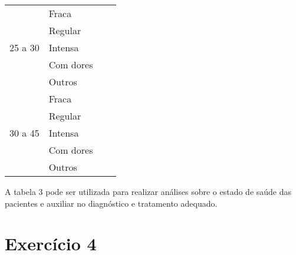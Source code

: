 \documentclass{article}
\begin{document}
\begin{table}[h!]
\begin{tabular}{|clll|}
\multicolumn{1}{|c|}{\multirow{5}{*}{25 a 30}} & \multicolumn{1}{l|}{Fraca}           & \multicolumn{1}{l|}{}            &       \\ \cline{2-4} 
\multicolumn{1}{|c|}{}                         & \multicolumn{1}{l|}{Regular}         & \multicolumn{1}{l|}{}            &       \\ \cline{2-4} 
\multicolumn{1}{|c|}{}                         & \multicolumn{1}{l|}{Intensa}         & \multicolumn{1}{l|}{}            &       \\ \cline{2-4} 
\multicolumn{1}{|c|}{}                         & \multicolumn{1}{l|}{Com dores}       & \multicolumn{1}{l|}{}            &       \\ \cline{2-4} 
\multicolumn{1}{|c|}{}                         & \multicolumn{1}{l|}{Outros}          & \multicolumn{1}{l|}{}            &       \\ \hline
\multicolumn{1}{|c|}{\multirow{5}{*}{30 a 45}} & \multicolumn{1}{l|}{Fraca}           & \multicolumn{1}{l|}{}            &       \\ \cline{2-4} 
\multicolumn{1}{|c|}{}                         & \multicolumn{1}{l|}{Regular}         & \multicolumn{1}{l|}{}            &       \\ \cline{2-4} 
\multicolumn{1}{|c|}{}                         & \multicolumn{1}{l|}{Intensa}         & \multicolumn{1}{l|}{}            &       \\ \cline{2-4} 
\multicolumn{1}{|c|}{}                         & \multicolumn{1}{l|}{Com dores}       & \multicolumn{1}{l|}{}            &       \\ \cline{2-4} 
\multicolumn{1}{|c|}{}                         & \multicolumn{1}{l|}{Outros}          & \multicolumn{1}{l|}{}            &       \\ \hline
\end{tabular}
\end{table}


A tabela 3 pode ser utilizada para realizar análises sobre o estado de saúde das pacientes e auxiliar no diagnóstico e tratamento adequado.


\section*{Exercício 4}
\end{document}
